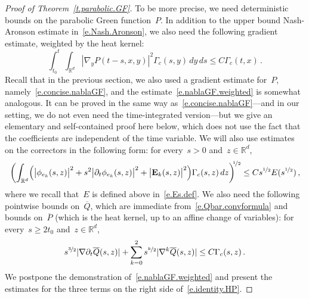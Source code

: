 \documentclass[11pt,twoside]{article} %
\numberwithin{equation}{section}
\theoremstyle{definition}
\newcommand*{\Rd}{\ensuremath{\mathbb{R}^d}}
\begin{document}
\begin{proof}[{Proof of Theorem~\ref{t.parabolic.GF}}]
To be more precise, we need deterministic bounds on the parabolic Green function~$P$. In addition to the upper bound Nash-Aronson estimate in~\eqref{e.Nash.Aronson}, we also need the following gradient estimate, weighted by the heat kernel:
\begin{equation}
\label{e.nablaGF.weighted}
\int_{t_0}^t  
\int_{\Rd} 
|\nabla_y P(t-s,x,y) |^2 \Gamma_c(s,y) \,dy\,ds
\leq C \Gamma_c(t,x)\,. 
\end{equation}
Recall that in the previous section, we also used a gradient estimate for~$P$, namely~\eqref{e.concise.nablaGF}, and the estimate~\eqref{e.nablaGF.weighted} is somewhat analogous. It can be proved in the same way as~\eqref{e.concise.nablaGF}---and in our setting, we do not even need the time-integrated version---but we give an elementary and self-contained proof here below, which does not use the fact that the coefficients are independent of the time variable. We will also use estimates on the correctors in the following form: for every~$s>0$ and~$z \in \Rd$,  
\begin{equation} \label{e.Green.E.est}
\biggl( 
\int_{\Rd} 
\Bigl( \bigl|\phi_{e_k}(s,z) \bigr|^2  + s^2 \bigl| \partial_t \phi_{e_k}(s,z) \bigr|^2 
+
\bigl|\mathbf{E}_k(s,z) \bigr|^2 \Bigr)
\Gamma_c(s,z)
\,dz
\biggr)^{\!\!\nicefrac12 } 
\leq C s^{\nicefrac12} E(s^{\nicefrac12}) \,,
\end{equation}
where we recall that~$E$ is defined above in~\eqref{e.Es.def}. We also need the following pointwise bounds on~$\overline{Q}$, which are immediate from~\eqref{e.Qbar.convformula} and bounds on~$\overline{P}$ (which is the heat kernel, up to an affine change of variables): for every~$s\geq 2t_0$ and~$z \in \Rd$, 
\begin{equation} \label{e.Qbar.bound}
s^{\nicefrac 32} |\nabla \partial_t \overline{Q} (s,z)| + 
\sum_{k=0}^2 s^{\nicefrac k2}|\nabla^k \overline{Q} (s,z)| \leq C \Gamma_c(s,z)\,.
\end{equation}
We postpone the demonstration of~\eqref{e.nablaGF.weighted} and present the estimates for the three terms on the right side of~\eqref{e.identity.HP}. 

\smallskip


\end{proof}
\end{document}
